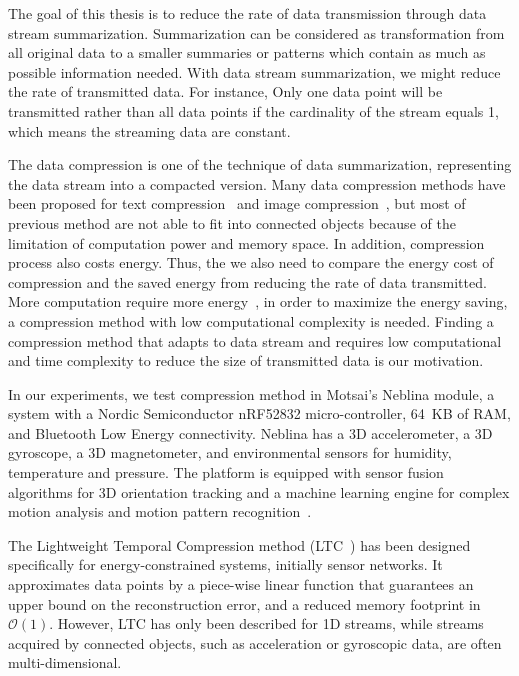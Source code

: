 The goal of this thesis is to reduce the rate of data transmission through data
stream summarization. Summarization can be considered as transformation from all
original data to a smaller summaries or patterns which contain as much as
possible information needed. With data stream summarization, we might reduce the
rate of transmitted data. For instance, Only one data point will be transmitted
rather than all data points if the cardinality of the stream equals 1, which
means the streaming data are constant. 

The data compression is one of the technique of data summarization, representing
the data stream into a compacted version. Many data compression methods have
been proposed for text compression~\cite{shanmugasundaram2011comparative,
sayood2017introduction} and image compression~\cite{shum2003survey,
zaineldin2015image}, but most of previous method are not able to fit into
connected objects because of the limitation of computation power and memory
space. In addition, compression process also costs energy. Thus, the we also
need to compare the energy cost of compression and the saved energy from
reducing the rate of data transmitted. More computation require more
energy~\cite{pope2018accelerometer}, in order to maximize the energy saving, a
compression method with low computational complexity is needed. Finding a
compression method that adapts to data stream and requires low computational and
time complexity to reduce the size of transmitted data is our motivation.

In our experiments, we test compression method in Motsai's Neblina module, a
system with a Nordic Semiconductor nRF52832 micro-controller, 64~KB of RAM, and
Bluetooth Low Energy connectivity. Neblina has a 3D accelerometer, a 3D
gyroscope, a 3D magnetometer, and environmental sensors for humidity,
temperature and pressure. The platform is equipped with sensor fusion algorithms
for 3D orientation tracking and a machine learning engine for complex motion
analysis and motion pattern recognition~\cite{sarbishei2016accuracy}.





The Lightweight Temporal Compression method
(LTC~\cite{schoellhammer2004lightweight}) has been designed  specifically for
energy-constrained systems, initially sensor networks.  It approximates data
points by a piece-wise linear function that  guarantees an upper bound on the
reconstruction error, and a reduced  memory footprint in $\mathcal{O}(1)$.
However, LTC has only been  described for 1D streams, while streams acquired by
connected objects, such as  acceleration or gyroscopic data, are often
multi-dimensional. 


